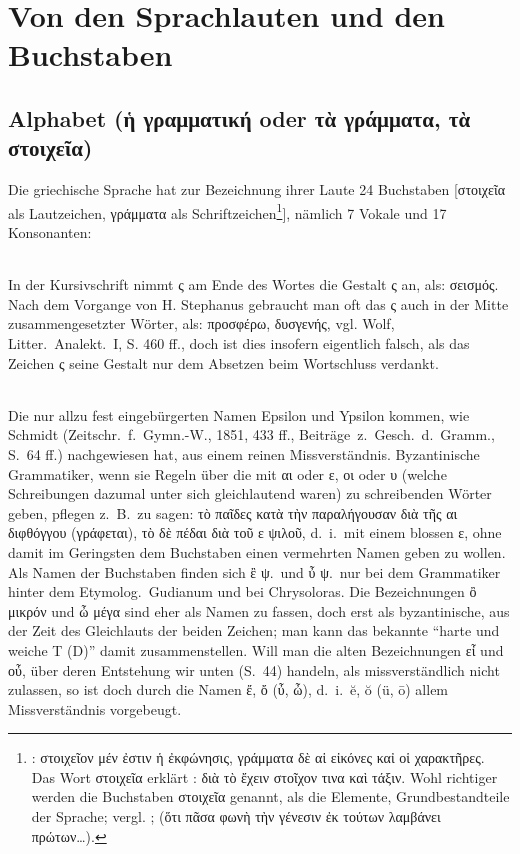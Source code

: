 
\chapter{Von den Sprachlauten und den Buchstaben}

\section{Alphabet (ἡ γραμματική oder τὰ γράμματα, τὰ στοιχεῖα)}\label{sec:alpha}\par

Die griechische Sprache hat zur Bezeichnung ihrer Laute 24 Buchstaben [στοιχεῖα als Lautzeichen, γράμματα als Schriftzeichen\footnote{
			: στοιχεῖον μέν ἐστιν ἡ ἐκφώνησις, γράμματα δὲ αἱ
			εἰκόνες καἰ οἱ χαρακτῆρες.
			Das Wort στοιχεῖα erklärt : διὰ τὸ ἔχειν
			στοῖχον τινα καὶ τάξιν.
			Wohl richtiger werden die Buchstaben στοιχεῖα genannt, als die Elemente,
			Grundbestandteile der Sprache; vergl.
			;
			 (ὅτι πᾶσα
			φωνὴ τὴν γένεσιν ἐκ τούτων λαμβάνει πρώτων\ldots{}).
		}], nämlich 7 Vokale und 17 Konsonanten:





{\small\noindent\subparagraph{\label{1.anmerk1}} In der
	Kursivschrift nimmt ς am Ende des Wortes die Gestalt ς an, als: σεισμός. Nach
	dem Vorgange von H. Stephanus gebraucht man oft das ς auch in der Mitte
	zusammengesetzter Wörter, als: προσφέρω, δυσγενής, vgl. Wolf,
	Litter.~Analekt.~I, S. 460 ff., doch ist dies insofern eigentlich falsch, als
	das Zeichen ς seine Gestalt nur dem Absetzen beim Wortschluss verdankt.}

{\small\noindent\subparagraph{\label{1.anmerk2}} Die nur allzu fest
	eingebürgerten Namen Epsilon und Ypsilon kommen,
	wie Schmidt (Zeitschr.~f.~Gymn.-W., 1851, 433 ff., Beiträge\ z.~Gesch.\ d.~Gramm.,
	S.~64 ff.) nachgewiesen hat, aus einem reinen Missverständnis. Byzantinische
	Grammatiker, wenn sie Regeln über die mit αι oder ε, οι oder υ (welche
	Schreibungen dazumal unter sich gleichlautend waren) zu schreibenden Wörter
	geben, pflegen z.~B.\ zu sagen: τὸ παῖδες κατὰ τὴν παραλήγουσαν διὰ τῆς αι
	διφθόγγου (γράφεται), τὸ δὲ πέδαι διὰ τοῦ ε ψιλοῦ, d.~i.~mit einem blossen ε,
	ohne damit im Geringsten dem Buchstaben einen vermehrten Namen geben zu wollen.
	Als Namen der Buchstaben finden sich ἒ ψ.\ und ὖ ψ.\ nur bei dem Grammatiker
	hinter dem Etymolog.~Gudianum und bei Chrysoloras. Die Bezeichnungen ὂ μικρόν
	und ὦ μέγα sind eher als Namen zu fassen, doch erst als byzantinische, aus der
	Zeit des Gleichlauts der beiden Zeichen; man kann das bekannte “harte und weiche
	T (D)” damit zusammenstellen. Will man die alten Bezeichnungen εἶ und οὖ, über
	deren Entstehung wir unten (S.\ 44) handeln, als missverständlich
	nicht zulassen, so ist doch durch die Namen ἔ, ὄ (ὖ, ὦ), d.~i.~ĕ, ŏ (ü, ō)
	allem Missverständnis vorgebeugt.}

